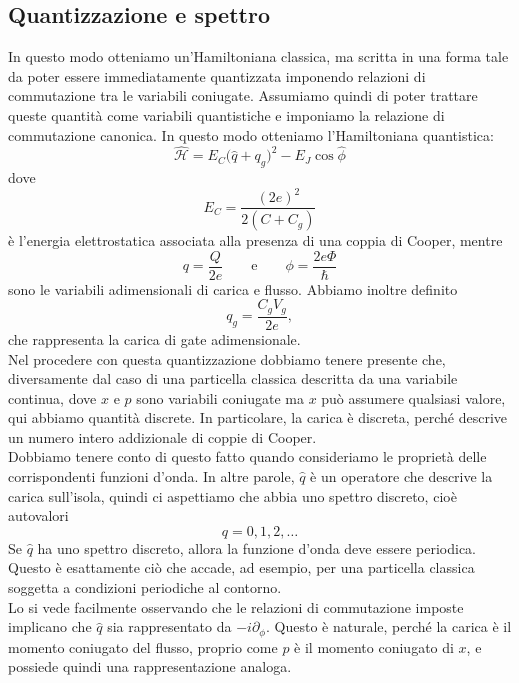 \subsection{Quantizzazione e spettro}
In questo modo otteniamo un'Hamiltoniana classica, ma scritta in una forma tale da poter essere immediatamente quantizzata imponendo relazioni di commutazione tra le variabili coniugate. Assumiamo quindi di poter trattare queste quantità come variabili quantistiche e imponiamo la relazione di commutazione canonica. In questo modo otteniamo l'Hamiltoniana quantistica:
\begin{equation}
    \hat{\mathcal{H}}
    =
    E_C \bigl( \hat{q} + q_g \bigr)^2
    -
    E_J \cos{\hat{\phi}}
    \label{eq:hamiltonian_cooper_pair_box}
\end{equation}
dove
\begin{equation*}
    E_C
    =
    \frac{(2e)^2}{2(C + C_g)}
\end{equation*}
è l'energia elettrostatica associata alla presenza di una coppia di Cooper, mentre
\[
q=\frac{Q}{2e}
\qquad\text{e}\qquad
\phi=\frac{2e\Phi}{\hbar}
\]
sono le variabili adimensionali di carica e flusso. Abbiamo inoltre definito
\[
q_g=\frac{C_g V_g}{2e},
\]
che rappresenta la carica di gate adimensionale.\\
Nel procedere con questa quantizzazione dobbiamo tenere presente che, diversamente dal caso di una particella classica descritta da una variabile continua, dove $x$ e $p$ sono variabili coniugate ma $x$ può assumere qualsiasi valore, qui abbiamo quantità discrete. In particolare, la carica è discreta, perché descrive un numero intero addizionale di coppie di Cooper.\\
Dobbiamo tenere conto di questo fatto quando consideriamo le proprietà delle corrispondenti funzioni d'onda. In altre parole, $\hat{q}$ è un operatore che descrive la carica sull'isola, quindi ci aspettiamo che abbia uno spettro discreto, cioè autovalori
\[
q=0,1,2,\ldots
\]
Se $\hat{q}$ ha uno spettro discreto, allora la funzione d'onda deve essere periodica. Questo è esattamente ciò che accade, ad esempio, per una particella classica soggetta a condizioni periodiche al contorno.\\
Lo si vede facilmente osservando che le relazioni di commutazione imposte implicano che $\hat{q}$ sia rappresentato da $-i\partial_\phi$. Questo è naturale, perché la carica è il momento coniugato del flusso, proprio come $p$ è il momento coniugato di $x$, e possiede quindi una rappresentazione analoga.\\
